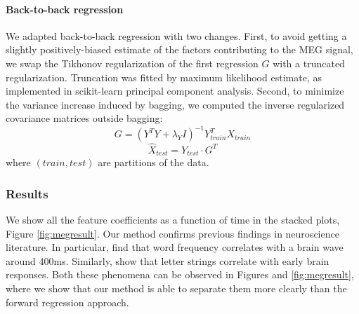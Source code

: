 \paragraph{Back-to-back regression} We adapted back-to-back regression with two
changes. First, to avoid getting a slightly positively-biased estimate of the
factors contributing to the MEG signal, we swap the Tikhonov regularization of
the first regression $G$ with a truncated regularization. Truncation was fitted
 by maximum likelihood estimate, as implemented in scikit-learn principal
 component analysis. Second, to minimize the variance increase induced by
 bagging, we computed the inverse regularized covariance matrices outside
 bagging:
\begin{equation}
  G = (Y^T Y+\lambda_Y I)^{-1} Y_{train}^T X_{train}
\end{equation}
\begin{equation}
\hat X_{test} = Y_{test} \cdot G^T
\end{equation} where $\left(train,test\right)$ are partitions of the data.
%
%


\subsubsection{Results}

We show all the feature coefficients as a function of time in the stacked plots,
Figure \ref{fig:megresult}. Our method confirms previous findings in
neuroscience literature. In particular, \cite{kutas2011thirty} find that word
frequency correlates with a brain wave around 400ms. Similarly,
\cite{pegado2014timing} show that letter strings correlate with early brain
responses. Both these phenomena can be observed in Figures
\label{fig:meg_twocurves} and \ref{fig:megresult}, where we show that our
method is able to separate them more clearly than the forward regression
approach.

